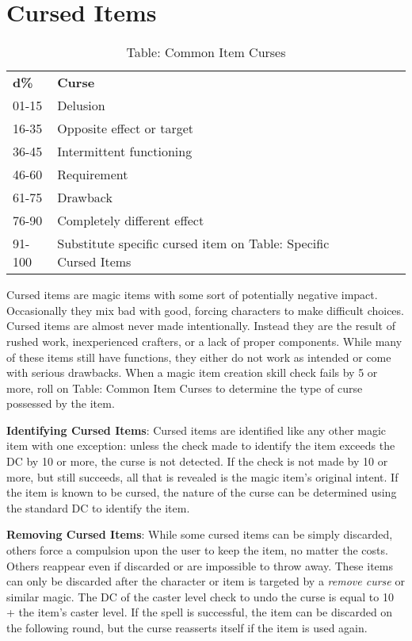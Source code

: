 \section{Cursed Items}

\label{f0}

\begin{table}[]
\sffamily
\caption{Table: Common Item Curses}
\begin{tabular}{lllllll}
\textbf{d\%} & \textbf{Curse}\\
01-15 & Delusion \\
 16-35 & Opposite effect or target \\
 36-45 & Intermittent functioning \\
 46-60 & Requirement \\
 61-75 & Drawback \\
 76-90 & Completely different effect \\
 91-100 & Substitute specific cursed item on Table: Specific Cursed Items\\
\end{tabular}
\end{table}
		
Cursed items are magic items with some sort of potentially negative impact. Occasionally they mix bad with good, forcing characters to make difficult choices. Cursed items are almost never made intentionally. Instead they are the result of rushed work, inexperienced crafters, or a lack of proper components. While many of these items still have functions, they either do not work as intended or come with serious drawbacks. When a magic item creation skill check fails by 5 or more, roll on Table: Common Item Curses to determine the type of curse possessed by the item.
				
\textbf{Identifying Cursed Items}: Cursed items are identified like any other magic item with one exception: unless the check made to identify the item exceeds the DC by 10 or more, the curse is not detected. If the check is not made by 10 or more, but still succeeds, all that is revealed is the magic item's original intent. If the item is known to be cursed, the nature of the curse can be determined using the standard DC to identify the item.
				
\textbf{Removing Cursed Items}: While some cursed items can be simply discarded, others force a compulsion upon the user to keep the item, no matter the costs. Others reappear even if discarded or are impossible to throw away. These items can only be discarded after the character or item is targeted by a \textit{remove curse} or similar magic. The DC of the caster level check to undo the curse is equal to 10 + the item's caster level. If the spell is successful, the item can be discarded on the following round, but the curse reasserts itself if the item is used again.
				
